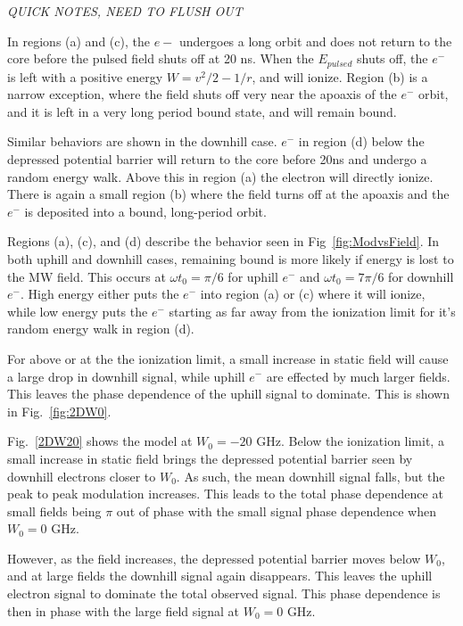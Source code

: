 \documentclass[aps,pra,preprint,groupedaddress]{revtex4-1}
\begin{document}
\emph{QUICK NOTES, NEED TO FLUSH OUT}

In regions (a) and (c), the $e-$ undergoes a long orbit and does not return to the core before the pulsed field shuts off at 20 ns. When the $E_{pulsed}$ shuts off, the $e^-$ is left with a positive energy $W = v^2/2 - 1/r$, and will ionize. Region (b) is a narrow exception, where the field shuts off very near the apoaxis of the $e^-$ orbit, and it is left in a very long period bound state, and will remain bound.

Similar behaviors are shown in the downhill case. $e^-$ in region (d) below the depressed potential barrier will return to the core before 20ns and undergo a random energy walk. Above this in region (a) the electron will directly ionize. There is again a small region (b) where the field turns off at the apoaxis and the $e^-$ is deposited into a bound, long-period orbit.

Regions (a), (c), and (d) describe the behavior seen in Fig~\ref{fig:ModvsField}. In both uphill and downhill cases, remaining bound is more likely if energy is lost to the MW field. This occurs at $\omega t_0 = \pi/6$ for uphill $e^-$ and $\omega t_0 = 7\pi/6$ for downhill $e^-$. High energy either puts the $e^-$ into region (a) or (c) where it will ionize, while low energy puts the $e^-$ starting as far away from the ionization limit for it's random energy walk in region (d).

For above or at the the ionization limit, a small increase in static field will cause a large drop in downhill signal, while uphill $e^-$ are effected by much larger fields. This leaves the phase dependence of the uphill signal to dominate. This is shown in Fig.~\ref{fig:2DW0}.

Fig.~\ref{2DW20} shows the model at $W_0 = -20$ GHz. Below the ionization limit, a small increase in static field brings the depressed potential barrier seen by downhill electrons closer to $W_0$. As such, the mean downhill signal falls, but the peak to peak modulation increases. This leads to the total phase dependence at small fields being $\pi$ out of phase with the small signal phase dependence when $W_0 = 0$ GHz.

However, as the field increases, the depressed potential barrier moves below $W_0$, and at large fields the downhill signal again disappears. This leaves the uphill electron signal to dominate the total observed signal. This phase dependence is then in phase with the large field signal at $W_0 = 0$ GHz.
\end{document}
